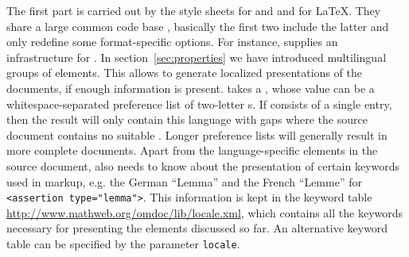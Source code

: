 The first part is carried out by the style sheets {} for
{\html} and and {} for {\LaTeX}. They share a large common
code base {}, basically the first two include the latter and
only redefine some format-specific options. For instance, {}
supplies an infrastructure for {}. In
section~\ref{sec:properties} we have introduced multilingual
groups of
{} elements. This allows to generate localized presentations of the
{\omdoc} documents, if enough information is present. {}
takes a {} {}, whose value can be a
whitespace-separated preference list of {} two-letter
{s}. If {} consists
of a single entry, then the result will only contain this language with gaps where
the source document contains no suitable {}. Longer
{} preference lists will generally result in more complete
documents. Apart from the language-specific elements in the source document,
{} also needs to know about the presentation of certain
keywords used in {\omdoc} markup, e.g.  the German ``Lemma'' and the French
``Lemme'' for \verb+<assertion type="lemma">+. This information is kept in the
keyword table {\url{http://www.mathweb.org/omdoc/lib/locale.xml}}, which contains
all the keywords necessary for presenting the {\omdoc} elements discussed so far.
An alternative keyword table can be specified by the parameter
{} {\tt{locale}}.

